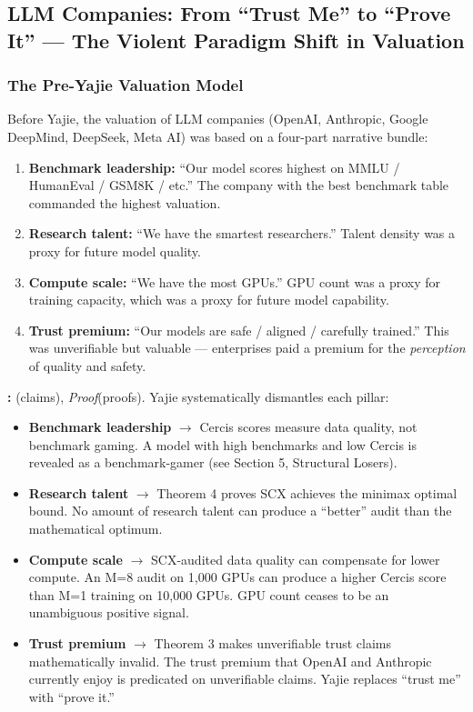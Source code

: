 \documentclass[12pt,a4paper]{article}
\theoremstyle{remark}
\begin{document}
\subsection{LLM Companies: From ``Trust Me'' to ``Prove It'' --- The Violent Paradigm Shift in Valuation}
\subsubsection{The Pre-Yajie Valuation Model}
Before Yajie, the valuation of LLM companies (OpenAI, Anthropic, Google 
DeepMind, DeepSeek, Meta AI) was based on a four-part narrative bundle:
\begin{enumerate}[label=(\arabic*), leftmargin=*]
 \item \textbf{Benchmark leadership:} ``Our model scores highest on 
 MMLU / HumanEval / GSM8K / etc.'' The company with the best 
 benchmark table commanded the highest valuation.
 \item \textbf{Research talent:} ``We have the smartest researchers.'' 
 Talent density was a proxy for future model quality.
 \item \textbf{Compute scale:} ``We have the most GPUs.'' GPU count 
 was a proxy for training capacity, which was a proxy for 
 future model capability.
 \item \textbf{Trust premium:} ``Our models are safe / aligned / 
 carefully trained.'' This was unverifiable but valuable --- 
 enterprises paid a premium for the \textit{perception} of 
 quality and safety.
\end{enumerate}
\noindent\textbf{: }
\textit{}(claims), \textit{Proof}(proofs).
Yajie systematically dismantles each pillar:
\begin{itemize}
 \item \textbf{Benchmark leadership} $\rightarrow$ Cercis scores measure 
 data quality, not benchmark gaming. A model with high benchmarks 
 and low Cercis is revealed as a benchmark-gamer (see Section 5, 
 Structural Losers).
 \item \textbf{Research talent} $\rightarrow$ Theorem 4 proves SCX 
 achieves the minimax optimal bound. No amount of research talent 
 can produce a ``better'' audit than the mathematical optimum.
 \item \textbf{Compute scale} $\rightarrow$ SCX-audited data quality 
 can compensate for lower compute. An M=8 audit on 1,000 GPUs 
 can produce a higher Cercis score than M=1 training on 10,000 
 GPUs. GPU count ceases to be an unambiguous positive signal.
 \item \textbf{Trust premium} $\rightarrow$ Theorem 3 makes unverifiable 
 trust claims mathematically invalid. The trust premium that 
 OpenAI and Anthropic currently enjoy is predicated on 
 unverifiable claims. Yajie replaces ``trust me'' with 
 ``prove it.''
\end{itemize}
\end{document}
